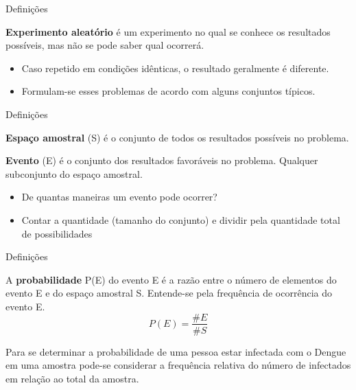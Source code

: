 \documentclass{beamer}
\begin{document}
\begin{frame}{Definições}
  \begin{definition}
    {\bf Experimento aleatório} é um experimento no qual se conhece os
    resultados possíveis, mas não se pode saber qual ocorrerá.
  \end{definition}

  \begin{itemize}
  \item Caso repetido em condições idênticas, o resultado geralmente é
    diferente.
  \item Formulam-se esses problemas de acordo com alguns conjuntos
    típicos.
  \end{itemize}

\end{frame}

\begin{frame}{Definições}
  \begin{definition}
    {\bf Espaço amostral} (S) é o conjunto de todos os resultados
    possíveis no problema.
  \end{definition}
  \begin{definition}
    {\bf Evento} (E) é o conjunto dos resultados favoráveis no
    problema. Qualquer subconjunto do espaço amostral.
  \end{definition}
  \begin{itemize}
  \item De quantas maneiras um evento pode ocorrer?
  \item Contar a quantidade (tamanho do conjunto) e dividir pela
    quantidade total de possibilidades
  \end{itemize}
\end{frame}

\begin{frame}{Definições}
  \begin{definition}
    A {\bf probabilidade} P(E) do evento E é a razão entre o número de
    elementos do evento E e do espaço amostral S. Entende-se pela
    \alert{frequência} de ocorrência do evento E.
    \begin{displaymath}
      P(E) = \frac{\#E}{\#S}
    \end{displaymath}
  \end{definition}
  \begin{example}
    Para se determinar a probabilidade de uma pessoa estar infectada
    com o Dengue em uma amostra pode-se considerar a frequência
    relativa do número de infectados em relação ao total da amostra.
  \end{example}
\end{frame}
\end{document}
